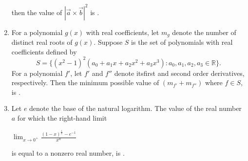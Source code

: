 \documentclass{article}
\begin{document}
\begin{enumerate}
    then the value of $|\vec{a} \times \vec{b}|^2$ is \underline{\hspace{2cm}}.

\item  For a polynomial $g(x)$ with real coefficients, let $m_g$ denote the number of distinct real roots of $g(x)$. Suppose $S$ is the set of polynomials with real coefficients defined by\[S = \{(x^2 - 1)^2 (a_0 + a_1 x + a_2 x^2 + a_3 x^3) : a_0, a_1, a_2, a_3 \in \mathbb{R} \}.\]For a polynomial $f'$, let $f'$ and $f''$ denote itsfirst and second order derivatives, respectively. Then the minimum possible value of $(m_{f'} + m_{f''})$ where $f \in S$, is \underline{\hspace{2cm}}.

\item  Let $e$ denote the base of the natural logarithm. The value of the real number $a$ for which the right-hand limit

\begin{center}
    $\lim_{x \to 0^+} \frac{(1 - x)^{\frac{1}{x}} - e^{-1}}{x^a}$
\end{center}

    is equal to a nonzero real number, is \underline{\hspace{2cm}}.


\end{enumerate}
\end{document}
